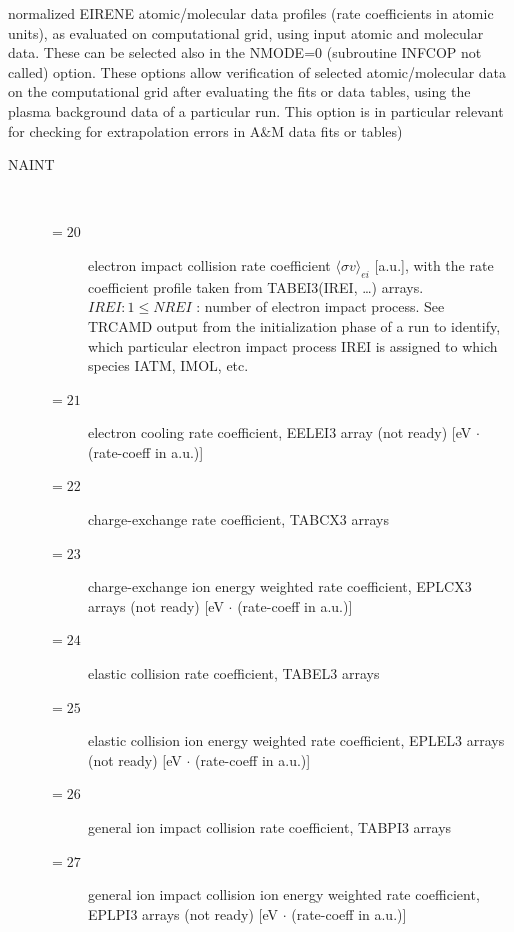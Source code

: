 normalized EIRENE atomic/molecular data profiles (rate coefficients in atomic
units), as evaluated on computational grid,
using input atomic and molecular data.
These can be selected also in the NMODE=0 (subroutine INFCOP not called)
option.
These options allow verification of selected atomic/molecular data on the
computational grid after evaluating the fits or data tables, using the plasma
background data of a particular run.
This option is in particular relevant for checking for extrapolation errors in
A$\&$M data fits or tables)
\begin{description}
  \item[NAINT] ~

        \begin{description}
          \item[$= 20$] electron impact collision rate coefficient
                $\langle\sigma v\rangle_{ei}$ [a.u.], with the rate coefficient profile taken
                from TABEI3(IREI, \dots) arrays.
                $IREI: 1 \le NREI$ : number of electron impact process.
                See TRCAMD output from the initialization phase of a run to identify, which
                particular electron impact process IREI is assigned to which species IATM,
                IMOL, etc.
          \item[$= 21$] electron cooling rate coefficient, EELEI3 array (not
                ready) [\si{\electronvolt} $\cdot$ (rate-coeff in a.u.)]
          \item[$= 22$]
                charge-exchange rate coefficient, TABCX3 arrays
          \item[$= 23$]
                charge-exchange ion energy weighted rate coefficient, EPLCX3
                arrays (not ready)
                [\si{\electronvolt} $\cdot$ (rate-coeff in a.u.)]
          \item[$= 24$]
                elastic collision rate coefficient, TABEL3 arrays
          \item[$= 25$]
                elastic collision ion energy weighted rate coefficient, EPLEL3
                arrays (not ready)
                [\si{\electronvolt} $\cdot$ (rate-coeff in a.u.)]
          \item[$= 26$]
                general ion impact collision rate coefficient, TABPI3 arrays
          \item[$= 27$]
                general ion impact collision ion energy weighted rate
                coefficient, EPLPI3 arrays (not ready)
                [\si{\electronvolt} $\cdot$ (rate-coeff in a.u.)]

\end{description}
\end{description}
